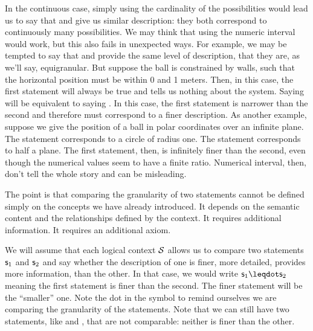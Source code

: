 \documentclass[11pt,letterpaper,fleqn]{memoir} %
\begin{document}

In the continuous case, simply using the cardinality of the possibilities would lead us to say that  and  give us similar description: they both correspond to continuously many possibilities. We may think that using the numeric interval would work, but this also fails in unexpected ways. For example, we may be tempted to say that  and  provide the same level of description, that they are, as we'll say, equigranular. But suppose the ball is constrained by walls, such that the horizontal position must be within 0 and 1 meters. Then, in this case, the first statement will always be true and tells us nothing about the system. Saying  will be equivalent to saying . In this case, the first statement is narrower than the second and therefore must correspond to a finer description. As another example, suppose we give the position of a ball in polar coordinates over an infinite plane. The statement  corresponds to a circle of radius one. The statement  corresponds to half a plane. The first statement, then, is infinitely finer than the second, even though the numerical values seem to have a finite ratio. Numerical interval, then, don't tell the whole story and can be misleading.


The point is that comparing the granularity of two statements cannot be defined simply on the concepts we have already introduced. It depends on the semantic content and the relationships defined by the context. It requires additional information. It requires an additional axiom.

We will assume that each logical context $\mathcal{S}$ allows us to compare two statements $\mathsf{s}_1$ and $\mathsf{s}_2$ and say whether the description of one is finer, more detailed, provides more information, than the other. In that case, we would write $\stmt_1 \finer \stmt_2$ meaning the first statement is finer than the second. The finer statement will be the ``smaller'' one. Note the dot in the symbol to remind ourselves we are comparing the granularity of the statements. Note that we can still have two statements, like  and , that are not comparable: neither is finer than the other.
\end{document}

